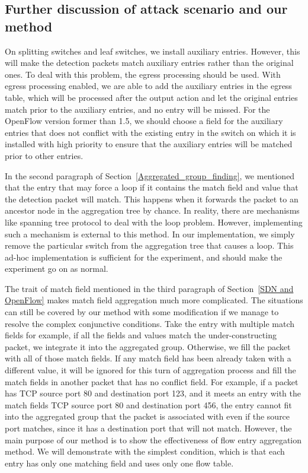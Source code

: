 \subsection{Further discussion of attack scenario and our method}
\label{Further_discussion}
On splitting switches and leaf switches, we install auxiliary entries. However, this will make the detection packets match auxiliary entries rather than the original ones. To deal with this problem, the egress processing should be used. With egress processing enabled, we are able to add the auxiliary entries in the egress table, which will be processed after the output action and let the original entries match prior to the auxiliary entries, and no entry will be missed. For the OpenFlow version former than 1.5, we should choose a field for the auxiliary entries that does not conflict with the existing entry in the switch on which it is installed with high priority to ensure that the auxiliary entries will be matched prior to other entries.

In the second paragraph of Section~\ref{Aggregated_group_finding}, we mentioned that the entry that may force a loop if it contains the match field and value that the detection packet will match. This happens when it forwards the packet to an ancestor node in the aggregation tree by chance. In reality, there are mechanisms like spanning tree protocol to deal with the loop problem. However, implementing such a mechanism is external to this method. In our implementation, we simply remove the particular switch from the aggregation tree that causes a loop. This ad-hoc implementation is sufficient for the experiment, and should make the experiment go on as normal.

The trait of match field mentioned in the third paragraph of Section~\ref{SDN and OpenFlow} makes match field aggregation much more complicated. The situations can still be covered by our method with some modification if we manage to resolve the complex conjunctive conditions. Take the entry with multiple match fields for example, if all the fields and values match the under-constructing packet, we integrate it into the aggregated group. Otherwise, we fill the packet with all of those match fields. If any match field has been already taken with a different value, it will be ignored for this turn of aggregation process and fill the match fields in another packet that has no conflict field. For example, if a packet has TCP source port 80 and destination port 123, and it meets an entry with the match fields TCP source port 80 and destination port 456, the entry cannot fit into the aggregated group that the packet is associated with even if the source port matches, since it has a destination port that will not match. However, the main purpose of our method is to show the effectiveness of flow entry aggregation method. We will demonstrate with the simplest condition, which is that each entry has only one matching field and uses only one flow table.

